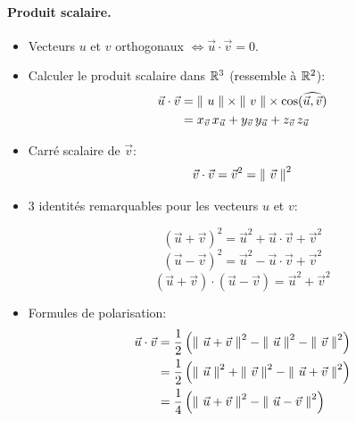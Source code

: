 \documentclass[12pt]{article}
\begin{document}
\paragraph{Produit scalaire.}
\begin{itemize}
    \item Vecteurs $u$ et $v$ orthogonaux $\iff \vec{u} \cdot \vec{v} = 0$. 
    \item Calculer le produit scalaire dans $\mathbb{R}^3$ (ressemble à $\mathbb{R}^2$): $$
    \begin{aligned}
        \vec{u} \cdot \vec{v} 
        & = \left\lVert\ u\;\right\rVert \times \left\lVert\ v\;\right\rVert \times \cos(\widehat{\vec{u}, \vec{v}}) \\
        & = x_{\vec{v}} \, x_{\vec{u}} 
          + y_{\vec{v}} \, y_{\vec{u}} 
          + z_{\vec{v}} \, z_{\vec{u}} \\
    \end{aligned} $$
    \item Carré scalaire de $\vec{v}$: $$
        \vec{v} \cdot \vec{v} = \vec{v}^2 = \left\lVert\ \vec{v}\;\right\rVert^2
    $$

    \item 3 identités remarquables pour les vecteurs $u$ et $v$: 
        
        \begin{equation} \label{IR1}
            (\vec{u} + \vec{v})^2 = \vec{u}^2 + \vec{u} \cdot \vec{v} + \vec{v}^2
        \end{equation} \begin{equation} \label{IR2}
            (\vec{u} - \vec{v})^2 = \vec{u}^2 - \vec{u} \cdot \vec{v} + \vec{v}^2
        \end{equation} \begin{equation} \label{IR3}
            (\vec{u} + \vec{v}) \cdot (\vec{u} - \vec{v}) 
            = \vec{u}^2 + \vec{v}^2
        \end{equation}

    \item Formules de polarisation: $$
    \begin{aligned}
    \vec{u} \cdot \vec{v} 
    & = \frac{1}{2}\left(
        \left\lVert\ \vec{u} + \vec{v}\;\right\rVert^2 
        - \left\lVert\ \vec{u}\;\right\rVert^2 
        - \left\lVert\ \vec{v}\;\right\rVert^2
    \right) \\
    & = \frac{1}{2}\left(
        \left\lVert\ \vec{u}\;\right\rVert^2
        + \left\lVert\ \vec{v}\;\right\rVert^2
        - \left\lVert\ \vec{u} + \vec{v}\;\right\rVert^2
    \right) \\
    & = \frac{1}{4}\left(
        \left\lVert\ \vec{u} + \vec{v}\;\right\rVert^2
        - \left\lVert\ \vec{u} - \vec{v}\;\right\rVert^2
    \right)
    \end{aligned} $$
\end{itemize}
\end{document}
